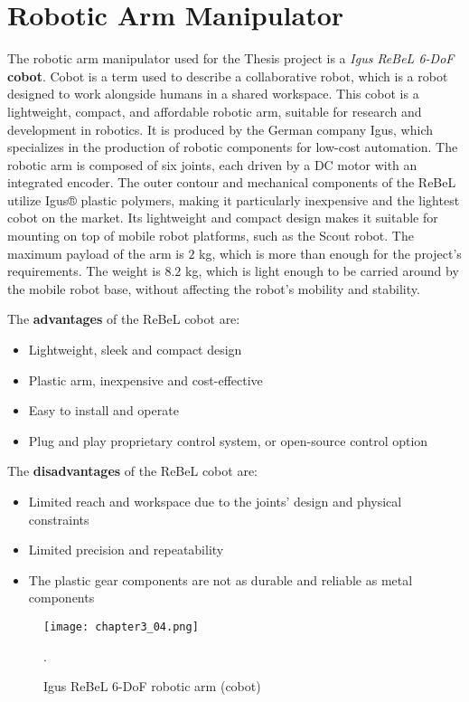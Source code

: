 \section{Robotic Arm Manipulator}

The robotic arm manipulator used for the Thesis project is a \textit{Igus ReBeL 6-DoF} \textbf{cobot}.
Cobot is a term used to describe a collaborative robot, which is a robot designed to work alongside humans in a shared workspace.
This cobot is a lightweight, compact, and affordable robotic arm, suitable for research and development
in robotics. It is produced by the German company Igus, which specializes in the production of robotic components
for low-cost automation. The robotic arm is composed of six joints, each driven by a DC motor with an integrated encoder.
The outer contour and mechanical components of the ReBeL utilize Igus® plastic polymers, making it particularly inexpensive
and the lightest cobot on the market. Its lightweight and compact design makes it suitable for mounting on top
of mobile robot platforms, such as the Scout robot. The maximum payload of the arm is $2$ kg, which is more than enough
for the project's requirements. The weight is $8.2$ kg, which is light enough to be carried around by the mobile robot base,
without affecting the robot's mobility and stability.

The \textbf{advantages} of the ReBeL cobot are:

\begin{itemize}
    \item Lightweight, sleek and compact design
    \item Plastic arm, inexpensive and cost-effective
    \item Easy to install and operate
    \item Plug and play proprietary control system, or open-source control option
\end{itemize}

The \textbf{disadvantages} of the ReBeL cobot are:
\begin{itemize}
    \item Limited reach and workspace due to the joints' design and physical constraints
    \item Limited precision and repeatability
    \item The plastic gear components are not as durable and reliable as metal components
\end{itemize}

\begin{figure}[t]
    \centering
    \texttt{[image: chapter3\_04.png]}
    \captionsetup{width=1\linewidth}
    \caption{Igus ReBeL 6-DoF robotic arm (cobot)}.
    \label{fig:c3_img04}
\end{figure}

